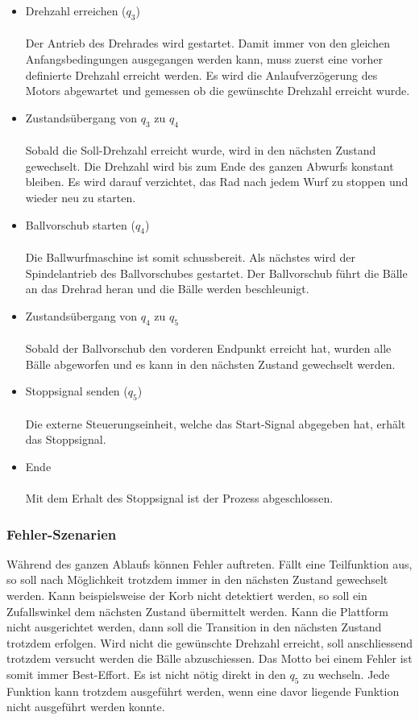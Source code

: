 \begin{itemize}
	\item Drehzahl erreichen ($q_{3}$) \\ \\
		  Der Antrieb des Drehrades wird gestartet. Damit immer von den gleichen Anfangsbedingungen ausgegangen werden kann, muss zuerst eine vorher definierte Drehzahl erreicht werden. Es wird die Anlaufverzögerung des Motors abgewartet und gemessen ob die gewünschte Drehzahl erreicht wurde.
	
	\item Zustandsübergang von $q_{3}$ zu $q_{4}$ \\ \\
		  Sobald die Soll-Drehzahl erreicht wurde, wird in den nächsten Zustand gewechselt. Die Drehzahl wird bis zum Ende des ganzen Abwurfs konstant bleiben. Es wird darauf verzichtet, das Rad nach jedem Wurf zu stoppen und wieder neu zu starten.
		  
	\item Ballvorschub starten ($q_{4}$) \\ \\
		  Die Ballwurfmaschine ist somit schussbereit. Als nächstes wird der Spindelantrieb des Ballvorschubes gestartet. Der Ballvorschub führt die Bälle an das Drehrad heran und die Bälle werden beschleunigt. 
		  
	\item Zustandsübergang von $q_{4}$ zu $q_{5}$ \\ \\
		  Sobald der Ballvorschub den vorderen Endpunkt erreicht hat, wurden alle Bälle abgeworfen und es kann in den nächsten Zustand gewechselt werden.
		  
	\item Stoppsignal senden ($q_{5}$) \\ \\
	      Die externe Steuerungseinheit, welche das Start-Signal abgegeben hat, erhält das Stoppsignal.
		  
	\item Ende \\ \\
		  Mit dem Erhalt des Stoppsignal ist der Prozess abgeschlossen.
		  
\end{itemize}

\subsubsection{Fehler-Szenarien}
Während des ganzen Ablaufs können Fehler auftreten. Fällt eine Teilfunktion aus, so soll nach Möglichkeit trotzdem immer in den nächsten Zustand gewechselt werden. Kann beispielsweise der Korb nicht detektiert werden, so soll ein Zufallswinkel dem nächsten Zustand übermittelt werden. Kann die Plattform nicht ausgerichtet werden, dann soll die Transition in den nächsten Zustand trotzdem erfolgen. Wird nicht die gewünschte Drehzahl erreicht, soll anschliessend trotzdem versucht werden die Bälle abzuschiessen. Das Motto bei einem Fehler ist somit immer Best-Effort. Es ist nicht nötig direkt in den $q_{5}$ zu wechseln. Jede Funktion kann trotzdem ausgeführt werden, wenn eine davor liegende Funktion nicht ausgeführt werden konnte.